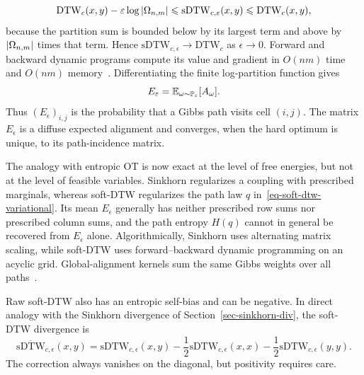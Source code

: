 \begin{equation}\label{eq-soft-dtw-zero-temperature-bound}
	\mathrm{DTW}_c(x,y)-\varepsilon\log\left\lvert\Omega_{n,m}\right\rvert
	\leqslant
	\mathrm{sDTW}_{c,\varepsilon}(x,y)
	\leqslant
	\mathrm{DTW}_c(x,y),
\end{equation}
because the partition sum is bounded below by its largest term and above by $\left\lvert\Omega_{n,m}\right\rvert$ times that term. Hence $\mathrm{sDTW}_{c,\epsilon}\to\mathrm{DTW}_c$ as $\epsilon\to0$. Forward and backward dynamic programs compute its value and gradient in $O(nm)$ time and $O(nm)$ memory~\cite{CuturiBlondel2017SoftDTW}. Differentiating the finite log-partition function gives
\begin{equation}\label{eq-soft-dtw-expected-alignment}
	E_\varepsilon
	=
	\mathbb{E}_{\omega\sim\mathbb{P}_\varepsilon}[A_\omega].
\end{equation}
Thus $(E_\epsilon)_{i,j}$ is the probability that a Gibbs path visits cell $(i,j)$. The matrix $E_\epsilon$ is a diffuse expected alignment and converges, when the hard optimum is unique, to its path-incidence matrix.

The analogy with entropic OT is now exact at the level of free energies, but not at the level of feasible variables. Sinkhorn regularizes a coupling with prescribed marginals, whereas soft-DTW regularizes the path law $q$ in~\eqref{eq-soft-dtw-variational}. Its mean $E_\epsilon$ generally has neither prescribed row sums nor prescribed column sums, and the path entropy $H(q)$ cannot in general be recovered from $E_\epsilon$ alone. Algorithmically, Sinkhorn uses alternating matrix scaling, while soft-DTW uses forward--backward dynamic programming on an acyclic grid. Global-alignment kernels sum the same Gibbs weights over all paths~\cite{CuturiVertBirkenesMatsui2007GlobalAlignment,Cuturi2011GlobalAlignment}.

Raw soft-DTW also has an entropic self-bias and can be negative. In direct analogy with the Sinkhorn divergence of Section~\ref{sec-sinkhorn-div}, the soft-DTW divergence is
\begin{equation}\label{eq-soft-dtw-divergence}
	\overline{\mathrm{sDTW}}_{c,\epsilon}(x,y)
	=
	\mathrm{sDTW}_{c,\epsilon}(x,y)
	-\frac12\mathrm{sDTW}_{c,\epsilon}(x,x)
	-\frac12\mathrm{sDTW}_{c,\epsilon}(y,y).
\end{equation}
The correction always vanishes on the diagonal, but positivity requires care.

